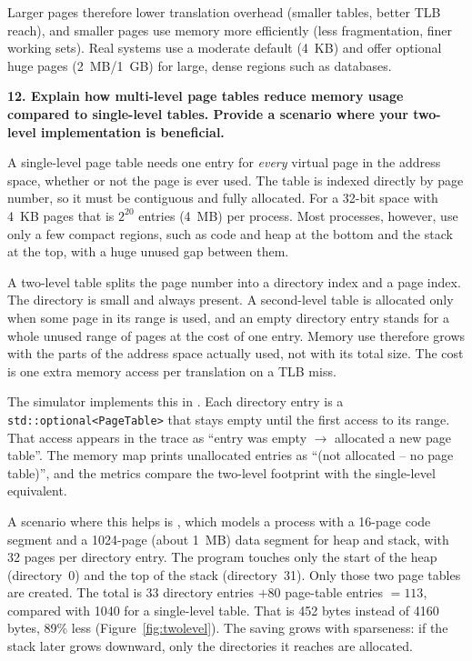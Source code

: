 \documentclass[11pt]{article}
\newcommand{\code}[1]{\texttt{\detokenize{#1}}}
\newcommand{\question}[1]{\par\medskip\noindent\textbf{#1}\par\smallskip}
\begin{document}
Larger pages therefore lower translation overhead (smaller tables, better TLB reach), and smaller
pages use memory more efficiently (less fragmentation, finer working sets). Real systems use a
moderate default (4~KB) and offer optional huge pages (2~MB/1~GB) for large, dense regions such as
databases.

\question{12. Explain how multi-level page tables reduce memory usage compared to single-level tables. Provide a scenario where your two-level implementation is beneficial.}
A single-level page table needs one entry for \emph{every} virtual page in the address space,
whether or not the page is ever used. The table is indexed directly by page number, so it must be contiguous
and fully allocated. For a 32-bit space with 4~KB pages that is $2^{20}$ entries (4~MB) per process.
Most processes, however, use only a few compact regions, such as code and heap at the bottom and the stack at the top,
with a huge unused gap between them.

A two-level table splits the page number into a directory index and a page index. The directory is
small and always present. A second-level table is allocated only when some page in its range is used,
and an empty directory entry stands for a whole unused range of pages at the cost of one entry. Memory
use therefore grows with the parts of the address space actually used, not with its total size. The cost is one
extra memory access per translation on a TLB miss.

The simulator implements this in \code{DirectoryTable}. Each directory entry is a
\texttt{std::\allowbreak optional<\allowbreak PageTable>} that stays empty until the first access to its range. That access
appears in the trace as ``entry was empty $\rightarrow$ allocated a new page table''. The memory map
prints unallocated entries as ``(not allocated -- no page table)'', and the metrics compare the two-level
footprint with the single-level equivalent.

A scenario where this helps is \code{sparse_config.txt}, which models a process with a 16-page code segment and
a 1024-page (about 1~MB) data segment for heap and stack, with 32 pages per directory entry. The
program touches only the start of the heap (directory~0) and the top of the stack (directory~31).
Only those two page tables are created. The total is $33$ directory entries $+ 80$ page-table entries
$= 113$, compared with 1040 for a single-level table. That is 452 bytes instead of 4160 bytes, 89\% less
(Figure~\ref{fig:twolevel}). The saving grows with sparseness: if the stack later grows downward,
only the directories it reaches are allocated.
\end{document}
